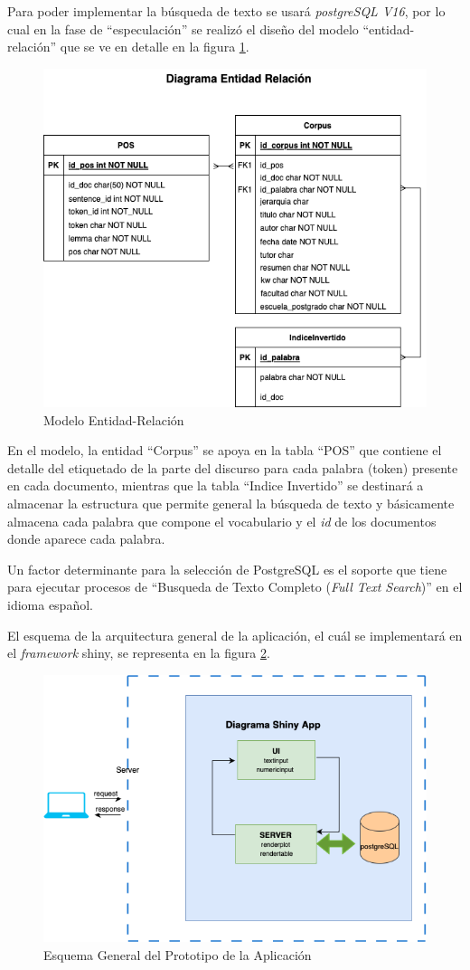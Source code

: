 \documentclass[
  12pt,
  openany]{book}
\begin{document}
Para poder implementar la búsqueda de texto se usará \emph{postgreSQL V16}, por lo cual en la fase de ``especulación'' se realizó el diseño del modelo ``entidad-relación'' que se ve en detalle en la figura \ref{fig:entrel}.

\begin{figure}

{\centering \includegraphics[width=0.6\linewidth]{images/05-desarrollo/2_ciclo/esquemas/diagrama_entidadrel} 

}

\caption{Modelo Entidad-Relación}\label{fig:entrel}
\end{figure}

En el modelo, la entidad ``Corpus'' se apoya en la tabla ``POS'' que contiene el detalle del etiquetado de la parte del discurso para cada palabra (token) presente en cada documento, mientras que la tabla ``Indice Invertido'' se destinará a almacenar la estructura que permite general la búsqueda de texto y básicamente almacena cada palabra que compone el vocabulario y el \emph{id} de los documentos donde aparece cada palabra.

Un factor determinante para la selección de PostgreSQL es el soporte que tiene para ejecutar procesos de ``Busqueda de Texto Completo (\emph{Full Text Search})'' en el idioma español.

El esquema de la arquitectura general de la aplicación, el cuál se implementará en el \emph{framework} shiny, se representa en la figura \ref{fig:esqshinyproto}.

\begin{figure}

{\centering \includegraphics[width=0.5\linewidth]{images/05-desarrollo/2_ciclo/esquemas/shinyappproto} 

}

\caption{Esquema General del Prototipo de la Aplicación}\label{fig:esqshinyproto}
\end{figure}
\end{document}
